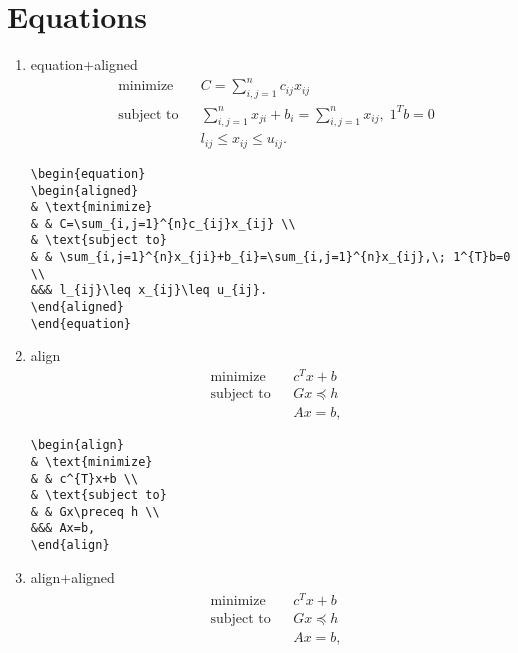 \chapter{Equations}

\begin{enumerate}
\item equation+aligned
\begin{equation}
\begin{aligned}
& \text{minimize}
& & C=\sum_{i,j=1}^{n}c_{ij}x_{ij} \\
& \text{subject to}
& & \sum_{i,j=1}^{n}x_{ji}+b_{i}=\sum_{i,j=1}^{n}x_{ij},\; 1^{T}b=0 \\
&&& l_{ij}\leq x_{ij}\leq u_{ij}.
\end{aligned}
\end{equation}
\begin{lstlisting}[language=Tex]
\begin{equation}
\begin{aligned}
& \text{minimize}
& & C=\sum_{i,j=1}^{n}c_{ij}x_{ij} \\
& \text{subject to}
& & \sum_{i,j=1}^{n}x_{ji}+b_{i}=\sum_{i,j=1}^{n}x_{ij},\; 1^{T}b=0 \\
&&& l_{ij}\leq x_{ij}\leq u_{ij}.
\end{aligned}
\end{equation}
\end{lstlisting}

\item align
\begin{align}
& \text{minimize}
& & c^{T}x+b \\
& \text{subject to}
& & Gx\preceq h \\
&&& Ax=b,
\end{align}

\begin{lstlisting}[language=Tex]
\begin{align}
& \text{minimize}
& & c^{T}x+b \\
& \text{subject to}
& & Gx\preceq h \\
&&& Ax=b,
\end{align}
\end{lstlisting}

\item align+aligned
\begin{align}
\begin{aligned}
& \text{minimize}
& & c^{T}x+b \\
& \text{subject to}
& & Gx\preceq h \\
&&& Ax=b,
\end{aligned}
\end{align}


\end{enumerate}
